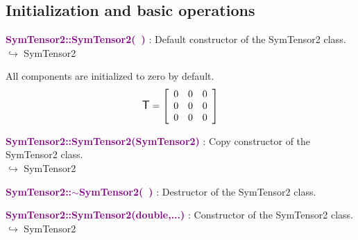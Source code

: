 \subsection{Initialization and basic operations}
\textcolor{purple}{\textbf{SymTensor2::SymTensor2(~)}}\label{SymTensor2::SymTensor2()} : Default constructor of the SymTensor2 class.\\ \hspace*{5mm}$\hookrightarrow$ SymTensor2

All components are initialized to zero by default.
\begin{equation*}
\mbox{\large\ensuremath{\mathsf{T}}}=\left[\begin{array}{ccc}
0&0&0\\
0&0&0\\
0&0&0
\end{array}\right]
\end{equation*}

\textcolor{purple}{\textbf{SymTensor2::SymTensor2(SymTensor2)}}\label{SymTensor2::SymTensor2(SymTensor2)} : Copy constructor of the SymTensor2 class.\\ \hspace*{5mm}$\hookrightarrow$ SymTensor2


\textcolor{purple}{\textbf{SymTensor2::$\sim$SymTensor2(~)}}\label{SymTensor2::~SymTensor2()} : Destructor of the SymTensor2 class.


\textcolor{purple}{\textbf{SymTensor2::SymTensor2(double,...)}}\label{SymTensor2::SymTensor2(double,...)} : Constructor of the SymTensor2 class.\\ \hspace*{5mm}$\hookrightarrow$ SymTensor2

